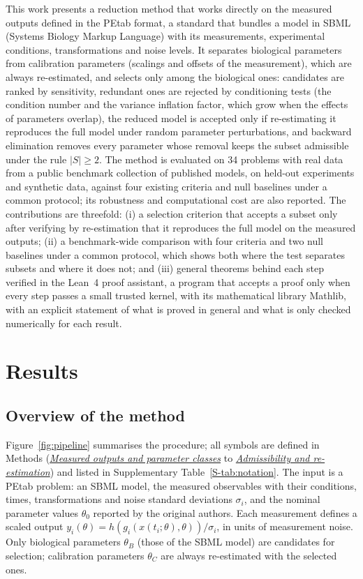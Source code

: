 \documentclass[pdflatex,sn-nature]{sn-jnl}
\theoremstyle{plain}
\newcommand{\mref}[2]{\hyperref[#1]{#2}}
\begin{document}
This work presents a reduction method that works directly on the measured outputs defined in the PEtab format\cite{bib27}, a standard that bundles a model in SBML (Systems Biology Markup Language) with its measurements, experimental conditions, transformations and noise levels. It separates biological parameters from calibration parameters (scalings and offsets of the measurement), which are always re-estimated, and selects only among the biological ones: candidates are ranked by sensitivity, redundant ones are rejected by conditioning tests (the condition number and the variance inflation factor, which grow when the effects of parameters overlap), the reduced model is accepted only if re-estimating it reproduces the full model under random parameter perturbations, and backward elimination removes every parameter whose removal keeps the subset admissible under the rule $|S|\ge2$. The method is evaluated on 34 problems with real data from a public benchmark collection of published models\cite{bib31,bib27}, on held-out experiments and synthetic data, against four existing criteria and null baselines under a common protocol; its robustness and computational cost are also reported. The contributions are threefold: (i) a selection criterion that accepts a subset only after verifying by re-estimation that it reproduces the full model on the measured outputs; (ii) a benchmark-wide comparison with four criteria and two null baselines under a common protocol, which shows both where the test separates subsets and where it does not; and (iii) general theorems behind each step verified in the Lean~4 proof assistant\cite{bib19,bib21}, a program that accepts a proof only when every step passes a small trusted kernel, with its mathematical library Mathlib, with an explicit statement of what is proved in general and what is only checked numerically for each result.

\section*{Results}\label{sec:results}

\subsection*{Overview of the method}\label{sec:overview}

Figure~\ref{fig:pipeline} summarises the procedure; all symbols are defined in Methods (\mref{met:outputs}{\emph{Measured outputs and parameter classes}} to \mref{met:adm}{\emph{Admissibility and re-estimation}}) and listed in Supplementary Table~\ref{S-tab:notation}. The input is a PEtab problem: an SBML model, the measured observables with their conditions, times, transformations and noise standard deviations $\sigma_i$, and the nominal parameter values $\theta_0$ reported by the original authors. Each measurement defines a scaled output $y_i(\theta)=h(g_i(x(t_i;\theta),\theta))/\sigma_i$, in units of measurement noise. Only biological parameters $\theta_B$ (those of the SBML model) are candidates for selection; calibration parameters $\theta_C$ are always re-estimated with the selected ones.
\end{document}
